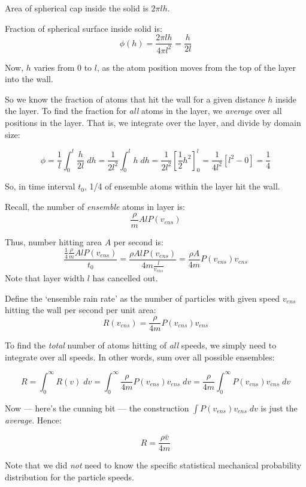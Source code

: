 \documentclass{paper}
\begin{document}
Area of spherical cap inside the solid is $2\pi l h$.

\vspace{1em}
Fraction of spherical surface inside solid is:
\[ \phi(h) = \frac{2 \pi l h}{4 \pi l^{2}} = \frac{h}{2l}\]

Now, $h$ varies from 0 to $l$, as the atom position moves from the top of the layer into the wall.

So we know the fraction of atoms that hit the wall for a given distance $h$ inside the layer. To find the fraction for \emph{all} atoms in the layer, we \emph{average} over all positions in the layer. That is, we integrate over the layer, and divide by domain size:

\[ \phi = \frac{1}{l}\int_{0}^{l} \frac{h}{2l} \; dh = \frac{1}{2l^{2}} \int_{0}^{l} h \;dh = \frac{1}{2l^{2}} [\frac{1}{2} h^{2}]_{0}^{l} =
\frac{1}{4l^{2}}[l^{2} - 0] = \frac{1}{4}  \]

So, in time interval $t_{0}$, 1/4 of ensemble atoms within the layer hit the wall.

\vspace{1em}
Recall, the number of \emph{ensemble} atoms in layer is:
\[ \frac{\rho}{m} A l P(v_{ens}) \]

Thus, number hitting area $A$ per second is:
\[ \frac{\frac{1}{4} \frac{\rho}{m} A l P(v_{ens})  }{t_{0}} 
 = \frac{\rho A l P(v_{ens})}{ 4 m \frac{l}{v_{ens}}} =
 \frac{\rho A}{4 m} P(v_{ens}) v_{ens} \] 
Note that layer width $l$ has cancelled out.

\vspace{1em}
Define the `ensemble rain rate' as the number of particles with given speed $v_{ens}$ hitting the wall per second per unit area:
\[ R(v_{ens}) = \frac{\rho}{4 m} P(v_{ens}) v_{ens} \]

\vspace{1em}
To find the \emph{total} number of atoms hitting of \emph{all} speeds, we simply need to integrate over all speeds.  In other words, sum over all possible ensembles:

\[ R = \int_{0}^{\infty} R(v) \; dv = \int_{0}^{\infty} \frac{\rho}{4 m} P(v_{ens}) v_{ens} \; dv = \frac{\rho}{4 m} \int_{0}^{\infty} P(v_{ens}) v_{ens} \; dv \]

Now --- here's the cunning bit --- the construction $ \int P(v_{ens}) v_{ens} \; dv$ is just the \emph{average}. Hence:

\[ R = \frac{\rho \bar{v}}{4 m} \]

Note that we did \emph{not} need to know the specific statistical mechanical probability distribution for the particle speeds.
\end{document}
